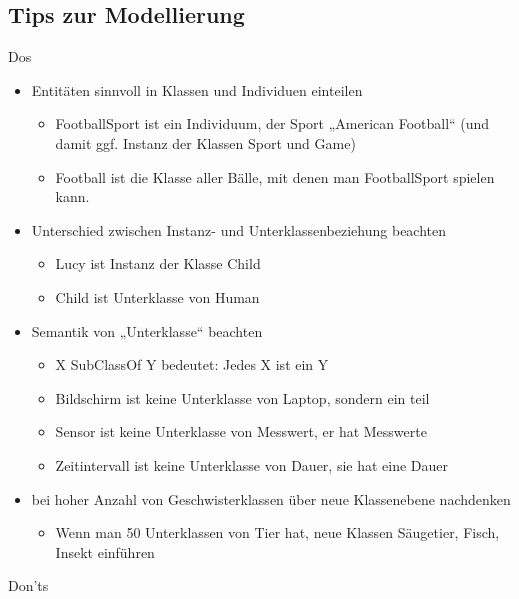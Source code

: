 \documentclass[a4paper]{article}
\begin{document}
\subsection{Tips zur Modellierung}

Dos

\begin{itemize}
    \item Entitäten sinnvoll in Klassen und Individuen einteilen
    \begin{itemize}
        \item FootballSport ist ein Individuum, der Sport „American Football“ (und damit ggf. Instanz der Klassen Sport und Game)
        \item Football ist die Klasse aller Bälle, mit denen man FootballSport spielen kann.
    \end{itemize}
    \item Unterschied zwischen Instanz- und Unterklassenbeziehung beachten
    \begin{itemize}
        \item Lucy ist Instanz der Klasse Child
        \item Child ist Unterklasse von Human
    \end{itemize}
    \item Semantik von „Unterklasse“ beachten
    \begin{itemize}
        \item X SubClassOf Y bedeutet: Jedes X ist ein Y
        \item Bildschirm ist keine Unterklasse von Laptop, sondern ein teil
        \item Sensor ist keine Unterklasse von Messwert, er hat Messwerte
        \item Zeitintervall ist keine Unterklasse von Dauer, sie hat eine Dauer
    \end{itemize}
    \item bei hoher Anzahl von Geschwisterklassen über neue Klassenebene nachdenken
    \begin{itemize}
        \item Wenn man 50 Unterklassen von Tier hat, neue Klassen Säugetier, Fisch, Insekt einführen
    \end{itemize}
\end{itemize}

Don'ts
\end{document}
